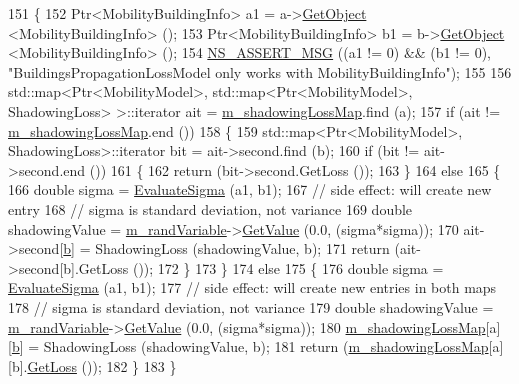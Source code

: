\begin{DoxyCode}
151 \{
152     Ptr<MobilityBuildingInfo> a1 = a->\hyperlink{classns3_1_1Object_a13e18c00017096c8381eb651d5bd0783}{GetObject} <MobilityBuildingInfo> ();
153     Ptr<MobilityBuildingInfo> b1 = b->\hyperlink{classns3_1_1Object_a13e18c00017096c8381eb651d5bd0783}{GetObject} <MobilityBuildingInfo> ();
154     \hyperlink{assert_8h_aff5ece9066c74e681e74999856f08539}{NS\_ASSERT\_MSG} ((a1 != 0) && (b1 != 0), \textcolor{stringliteral}{"BuildingsPropagationLossModel only works with
       MobilityBuildingInfo"});
155   
156   std::map<Ptr<MobilityModel>,  std::map<Ptr<MobilityModel>, ShadowingLoss> >::iterator ait = 
      \hyperlink{classns3_1_1BuildingsPropagationLossModel_a1f4f47c67f9ad77df6808d82b1277dc9}{m\_shadowingLossMap}.find (a);
157   \textcolor{keywordflow}{if} (ait != \hyperlink{classns3_1_1BuildingsPropagationLossModel_a1f4f47c67f9ad77df6808d82b1277dc9}{m\_shadowingLossMap}.end ())
158     \{
159       std::map<Ptr<MobilityModel>, ShadowingLoss>::iterator bit = ait->second.find (b);
160       \textcolor{keywordflow}{if} (bit != ait->second.end ())
161         \{
162           \textcolor{keywordflow}{return} (bit->second.GetLoss ());
163         \}
164       \textcolor{keywordflow}{else}
165         \{
166           \textcolor{keywordtype}{double} sigma = \hyperlink{classns3_1_1BuildingsPropagationLossModel_ab1007b81884b18564b1d1542fa6ee6b8}{EvaluateSigma} (a1, b1);
167           \textcolor{comment}{// side effect: will create new entry          }
168           \textcolor{comment}{// sigma is standard deviation, not variance}
169           \textcolor{keywordtype}{double} shadowingValue = \hyperlink{classns3_1_1BuildingsPropagationLossModel_ae3c9b1fdf792660412496302a44661ec}{m\_randVariable}->\hyperlink{classns3_1_1NormalRandomVariable_a0134d131477bc439cc6ff7cbe84b03a9}{GetValue} (0.0, (sigma*sigma));
170           ait->second[\hyperlink{buildings__pathloss_8m_a21ad0bd836b90d08f4cf640b4c298e7c}{b}] = ShadowingLoss (shadowingValue, b);          
171           \textcolor{keywordflow}{return} (ait->second[b].GetLoss ());
172         \}
173     \}
174   \textcolor{keywordflow}{else}
175     \{
176       \textcolor{keywordtype}{double} sigma = \hyperlink{classns3_1_1BuildingsPropagationLossModel_ab1007b81884b18564b1d1542fa6ee6b8}{EvaluateSigma} (a1, b1);
177       \textcolor{comment}{// side effect: will create new entries in both maps}
178       \textcolor{comment}{// sigma is standard deviation, not variance}
179       \textcolor{keywordtype}{double} shadowingValue = \hyperlink{classns3_1_1BuildingsPropagationLossModel_ae3c9b1fdf792660412496302a44661ec}{m\_randVariable}->\hyperlink{classns3_1_1NormalRandomVariable_a0134d131477bc439cc6ff7cbe84b03a9}{GetValue} (0.0, (sigma*sigma));
180       \hyperlink{classns3_1_1BuildingsPropagationLossModel_a1f4f47c67f9ad77df6808d82b1277dc9}{m\_shadowingLossMap}[a][\hyperlink{buildings__pathloss_8m_a21ad0bd836b90d08f4cf640b4c298e7c}{b}] = ShadowingLoss (shadowingValue, b);  
181       \textcolor{keywordflow}{return} (\hyperlink{classns3_1_1BuildingsPropagationLossModel_a1f4f47c67f9ad77df6808d82b1277dc9}{m\_shadowingLossMap}[a][b].\hyperlink{classns3_1_1BuildingsPropagationLossModel_a6d3a26e3118fdfd83253387f4360dc55}{GetLoss} ());       
182     \}
183 \}
\end{DoxyCode}


